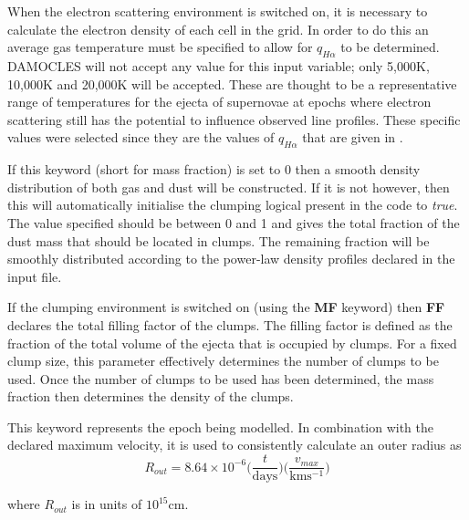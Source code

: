 
 When the electron scattering environment is switched on, it is necessary to calculate the electron density of each cell in the grid.  In order to do this an average gas temperature must be specified to allow for $q_{H\alpha}$ to be determined.  DAMOCLES will not accept any value for this input variable; only 5,000K, 10,000K and 20,000K will be accepted.  These are thought to be a representative range of temperatures for the ejecta of supernovae at epochs where electron scattering still has the potential to influence observed line profiles.  These specific values were selected since they are the values of $q_{H\alpha}$ that are given in \citet{Osterbrock2006}.


 If this keyword (short for mass fraction) is set to 0 then a smooth density distribution of both gas and dust will be constructed.   If it is not however, then this will automatically initialise the clumping logical present in the code to \textit{true}.  The value specified should be between 0 and 1 and gives the total fraction of the dust mass that should be located in clumps.  The remaining fraction will be smoothly distributed according to the power-law density profiles declared in the input file.


 If the clumping environment is switched on (using the \textbf{MF} keyword) then \textbf{FF} declares the total filling factor of the clumps.  The filling factor is defined as the fraction of the total volume of the ejecta that is occupied by clumps.  For a fixed clump size, this parameter effectively determines the number of clumps to be used.  Once the number of clumps to be used has been determined, the mass fraction then determines the density of the clumps.
 

 This keyword represents the epoch being modelled.  In combination with the declared maximum velocity, it is used to consistently calculate an outer radius as 
 \begin{equation}
 R_{out}=8.64 \times 10^{-6} \Big( \frac{t}{\mathrm{days}} \Big) \Big( \frac{v_{max}}{\mathrm{kms^{-1}}} \Big)
 \label{eqn:Rout_calcn}
 \end{equation}

 \noindent where $R_{out}$ is in units of $10^{15}$cm.



